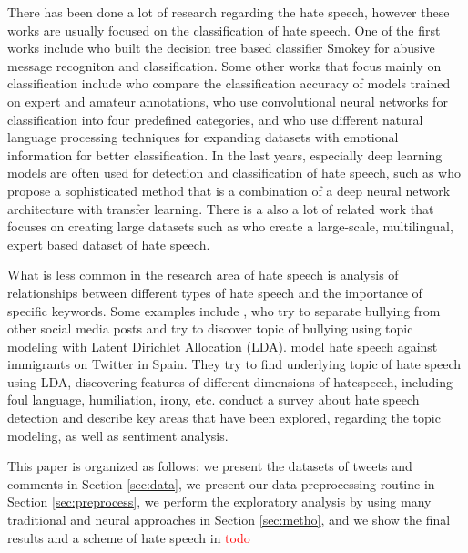 \documentclass[fleqn,moreauthors,10pt]{ds_report}
\begin{document}
There has been done a lot of research regarding the hate speech, however these works are usually focused on the classification of hate speech. One of the first works include \cite{spertus1997smokey} who built the decision tree based classifier Smokey for abusive message recogniton and classification. Some other works that focus mainly on classification include \cite{waseem2016you} who compare the classification accuracy of models trained on expert and amateur annotations, \cite{gamback2017using} who use convolutional neural networks for classification into four predefined categories, and \cite{martins2018hate} who use different natural language processing techniques for expanding datasets with emotional information for better classification. In the last years, especially deep learning models are often used for detection and classification of hate speech, such as \cite{rizoiu2019transfer} who propose a sophisticated method that is a combination of a deep neural network architecture with transfer learning.
There is a also a lot of related work that focuses on creating large datasets such as \cite{chung2019conan} who create a large-scale, multilingual, expert based dataset of hate speech. 

What is less common in the research area of hate speech is analysis of relationships between different types of hate speech and the importance of specific keywords. Some examples include \cite{xu2012learning}, who try to separate bullying from other social media posts and try to discover topic of bullying using topic modeling with Latent Dirichlet Allocation (LDA). \cite{calderon2020topic} model hate speech against immigrants on Twitter in Spain. They try to find underlying topic of hate speech using LDA, discovering features of different dimensions of hatespeech, including foul language, humiliation, irony, etc. \cite{schmidt2017survey} conduct a survey about hate speech detection and describe key areas that have been explored, regarding the topic modeling, as well as sentiment analysis.

This paper is organized as follows: we present the datasets of tweets and comments in Section \ref{sec:data}, we present our data preprocessing routine in Section \ref{sec:preprocess}, we perform the exploratory analysis by using many traditional and neural approaches in Section \ref{sec:metho}, and we show the final results and a scheme of hate speech in \textcolor{red}{todo}

\end{document}

